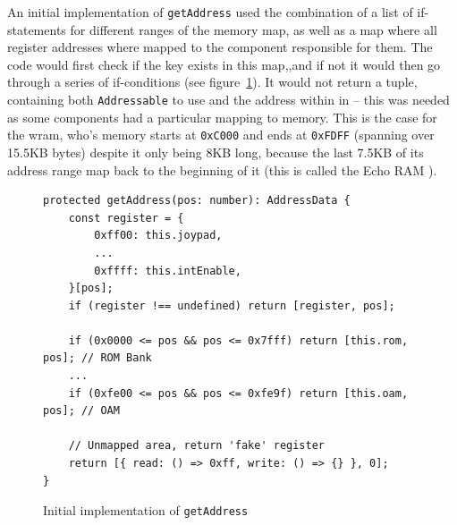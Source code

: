 \documentclass[11pt]{informatics-report}
\begin{document}
An initial implementation of \texttt{getAddress} used the combination of a list of if-statements for different ranges of the memory map, as well as a map where all register addresses where mapped to the component responsible for them. The code would first check if the key exists in this map,,and if not it would then go through a series of if-conditions  (see figure~\ref{fig:getaddress-before}). It would not return a tuple, containing both \texttt{Addressable} to use and the address within in -- this was needed as some components had a particular mapping to memory. This is the case for the \gls{wram}, who's memory starts at \texttt{0xC000} and ends at \texttt{0xFDFF} (spanning over 15.5KB bytes) despite it only being 8KB long, because the last 7.5KB of its address range map back to the beginning of it (this is called the Echo RAM \cite{memorymap}).

\begin{figure}[h]
    \begin{verbatim}
protected getAddress(pos: number): AddressData {
    const register = {
        0xff00: this.joypad,
        ...
        0xffff: this.intEnable,
    }[pos];
    if (register !== undefined) return [register, pos];

    if (0x0000 <= pos && pos <= 0x7fff) return [this.rom, pos]; // ROM Bank
    ...
    if (0xfe00 <= pos && pos <= 0xfe9f) return [this.oam, pos]; // OAM

    // Unmapped area, return 'fake' register
    return [{ read: () => 0xff, write: () => {} }, 0];
}
    \end{verbatim}
    \caption{Initial implementation of \texttt{getAddress}}
    \label{fig:getaddress-before}
\end{figure}
\end{document}
